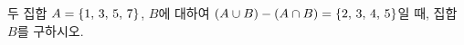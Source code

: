 두 집합 $A=\{1,\mkern3mu 3,\mkern3mu 5,\mkern3mu 7\}$, $B$에 대하여 $(A\cup B)-(A\cap B)=\{2,\mkern3mu 3,\mkern3mu 4,\mkern3mu 5\}$일 때, 집합 $B$를 구하시오.
